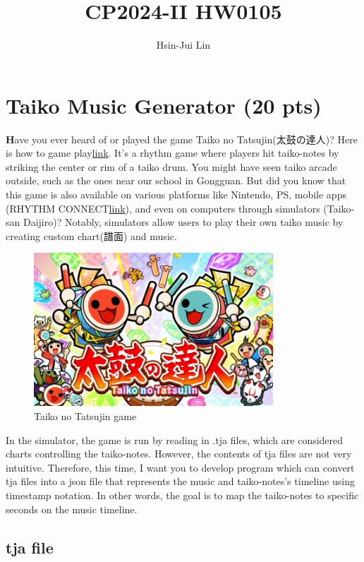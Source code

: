 \documentclass[a4paper,11pt, ctexart]{article}
\title{CP2024-II HW0105}
\author{Hsin-Jui Lin}
\begin{document}
\maketitle

\section{Taiko Music Generator (20 pts)}
\textbf
Have you ever heard of or played the game Taiko no Tatsujin(太鼓の達人)? Here is how to game play{\href{https://taiko.namco-ch.net/taiko/tc/howto/index.php}{\tiny link}}. It's a rhythm game where players hit taiko-notes by striking the center or rim of a taiko drum. You might have seen taiko arcade outside, such as the ones near our school in Gongguan. But did you know that this game is also available on various platforms like Nintendo, PS, mobile apps (RHYTHM CONNECT{\href{https://app-ttrc.taiko-ch.net/ch/}{\tiny link}}), and even on computers through simulators (Taiko-san Daijiro)? Notably, simulators allow users to play their own taiko music by creating custom chart(譜面) and music.

\begin{figure}[h]
    \centering
    \includegraphics[width=0.8\textwidth]{assets/taiko-no-tatsujin.jpg}
    \caption{Taiko no Tatsujin game}
\end{figure}

In the simulator, the game is run by reading in .tja files, which are considered charts controlling the taiko-notes. However, the contents of tja files are not very intuitive. Therefore, this time, I want you to develop program which can convert tja files into a json file that represents the music and taiko-notes's timeline using timestamp notation. In other words, the goal is to map the taiko-notes to specific seconds on the music timeline.

\subsection{tja file}
\end{document}
